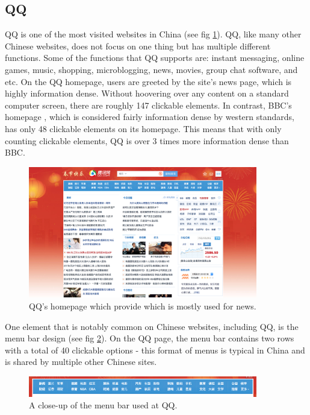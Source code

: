 \subsection{QQ}
QQ is one of the  most visited websites in China (see fig \ref{fig:QQ.com}). \cite{top_sites_china} \cite{top_sites_alexa} QQ, like many other Chinese websites, does not focus on one thing but has multiple different functions. Some of the functions that QQ supports are: instant messaging, online  games, music, shopping, microblogging, news, movies, group chat software, and etc. On the QQ homepage, users are greeted by the site's news page, which is highly information dense. Without hoovering over any content on a standard computer screen, there are roughly 147 clickable elements.  In contrast,  BBC's homepage \cite{bbc}, which is considered fairly information dense by western standards, has only 48 clickable elements on its homepage. This means that with only counting clickable elements, QQ is over 3 times more information dense than BBC. 


\begin{figure}[h]
\centering
\includegraphics[width=100mm]{Images/QQ.png}
\decoRule
\caption[QQ.com]{QQ's homepage which provide which is mostly used for news.}
\label{fig:QQ.com}
\end{figure}
One element that is notably common on Chinese websites, including QQ, is the menu bar design (see fig \ref{fig:QQ_menubar}). On the QQ page, the menu bar contains two rows with a total of 40 clickable options - this format of menus is typical in China and is shared by multiple  other Chinese sites. 


\begin{figure}[h]
\centering
\includegraphics[width=100mm]{Images/QQ_menubar.png}
\decoRule
\caption[QQ's Menu bar]{A close-up of the menu bar used at QQ.}
\label{fig:QQ_menubar}
\end{figure}



